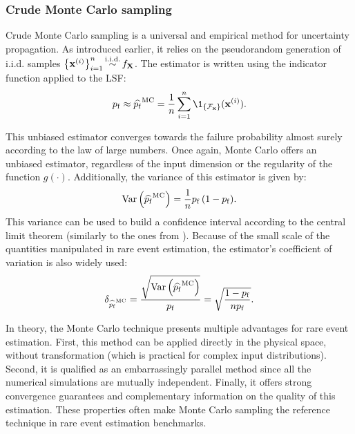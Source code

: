 \subsubsection{Crude Monte Carlo sampling}
Crude Monte Carlo sampling is a universal and empirical method for uncertainty propagation. 
As introduced earlier, it relies on the pseudorandom generation of i.i.d. samples $\left\{{\bf x}^{(i)}\right\}_{i=1}^n \mathop{\sim}\limits^{\mathrm{i.i.d.}} f_{\bf X}$.   
The estimator is written using the indicator function applied to the LSF: 
\begin{equation}
    \pf \approx \what{\pf}^{\textrm{MC}} = \frac1n \sum_{i=1}^{n} \1_{\{\iF_\bx\}}(\bx^{(i)}).
\end{equation} 

This unbiased estimator converges towards the failure probability almost surely according to the law of large numbers. 
Once again, Monte Carlo offers an unbiased estimator, regardless of the input dimension or the regularity of the function $g(\cdot)$.   
Additionally, the variance of this estimator is given by:
\begin{equation}
    \operatorname{Var}\left(\widehat{p_\mathrm{f}}^{\textrm{MC}}\right) = \frac1n p_\mathrm{f} \, (1 - p_\mathrm{f}).
\end{equation} 
This variance can be used to build a confidence interval according to the central limit theorem (similarly to the ones from ). 
Because of the small scale of the quantities manipulated in rare event estimation, the estimator's coefficient of variation is also widely used: 
\begin{equation}
    \delta_{\widehat{p_\mathrm{f}}^{\textrm{MC}}} = \frac{\sqrt{\operatorname{Var}\left(\widehat{p_\mathrm{f}}^{\textrm{MC}}\right)}}{p_\mathrm{f}}
                                      = \sqrt{\frac{1 - p_\mathrm{f}}{n p_\mathrm{f}}}.
\end{equation}

In theory, the Monte Carlo technique presents multiple advantages for rare event estimation. 
First, this method can be applied directly in the physical space, without transformation (which is practical for complex input distributions). 
Second, it is qualified as an embarrassingly parallel method since all the numerical simulations are mutually independent. 
Finally, it offers strong convergence guarantees and complementary information on the quality of this estimation. 
These properties often make Monte Carlo sampling the reference technique in rare event estimation benchmarks. 

